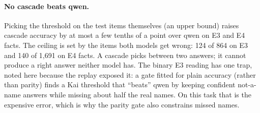 \documentclass[11pt]{article}
\begin{document}
\paragraph{No cascade beats qwen.} Picking the threshold on the test items themselves (an upper
bound) raises cascade accuracy by at most a few tenths of a point over qwen on E3 and E4 facts.
The ceiling is set by the items both models get wrong: 124 of 864 on E3 and 140 of 1{,}691 on E4
facts. A cascade picks between
two answers; it cannot produce a right answer neither model has. The binary E3 reading has one trap,
noted here because the replay exposed it: a gate fitted for plain accuracy (rather than parity)
finds a Kai threshold that ``beats'' qwen by keeping confident not-a-name answers while missing
about half the real names. On this task that is the expensive error, which is why the parity gate
also constrains missed names.
\end{document}
